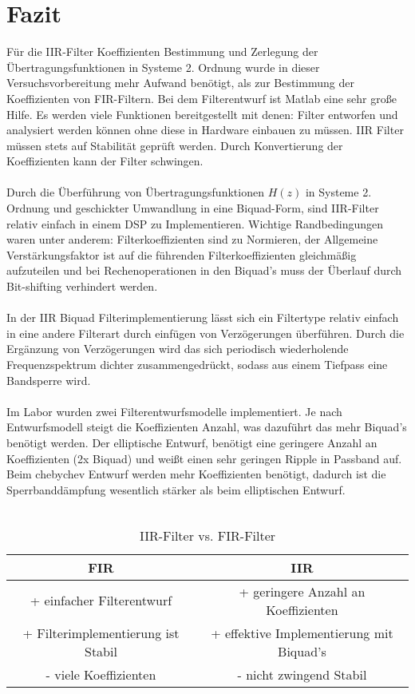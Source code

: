 \section{Fazit}

Für die IIR-Filter Koeffizienten Bestimmung und Zerlegung der Übertragungsfunktionen in Systeme 2. Ordnung wurde in dieser Versuchsvorbereitung mehr Aufwand benötigt, als zur Bestimmung der Koeffizienten von FIR-Filtern. Bei dem Filterentwurf ist Matlab eine sehr große Hilfe. Es werden viele Funktionen bereitgestellt mit denen: Filter entworfen und analysiert werden können ohne diese in Hardware einbauen zu müssen. IIR Filter müssen stets auf Stabilität geprüft werden. Durch Konvertierung der Koeffizienten kann der Filter schwingen.\\\\
\noindent Durch die Überführung von Übertragungsfunktionen $H(z)$ in Systeme 2. Ordnung und geschickter Umwandlung in eine Biquad-Form, sind IIR-Filter relativ einfach in einem DSP zu Implementieren. Wichtige Randbedingungen waren unter anderem: Filterkoeffizienten sind zu Normieren, der Allgemeine Verstärkungsfaktor ist auf die führenden Filterkoeffizienten gleichmäßig aufzuteilen und bei Rechenoperationen in den Biquad's muss der Überlauf durch Bit-shifting verhindert werden.\\\\
In der IIR Biquad Filterimplementierung lässt sich ein Filtertype relativ einfach in eine andere Filterart durch einfügen von Verzögerungen überführen. Durch die Ergänzung von Verzögerungen wird das sich periodisch wiederholende Frequenzspektrum dichter zusammengedrückt, sodass aus einem Tiefpass eine Bandsperre wird.\\\\
Im Labor wurden zwei Filterentwurfsmodelle implementiert. Je nach Entwurfsmodell steigt die Koeffizienten Anzahl, was dazuführt das mehr Biquad's benötigt werden. Der elliptische Entwurf, benötigt eine geringere Anzahl an Koeffizienten (2x Biquad) und weißt einen sehr geringen Ripple in Passband auf. Beim chebychev Entwurf werden mehr Koeffizienten benötigt, dadurch ist die Sperrbanddämpfung wesentlich stärker als beim elliptischen Entwurf.\\\\

\begin{table}[h]
	\centering
	\begin{tabular}{c | c}
	FIR & IIR	\\
	\hline
	+ einfacher Filterentwurf	&	+ geringere Anzahl an Koeffizienten \\
	+ Filterimplementierung ist Stabil		&	+ effektive Implementierung mit Biquad's\\
	- viele Koeffizienten	& - nicht zwingend Stabil\\
	\end{tabular}
	\caption{IIR-Filter vs. FIR-Filter}
\end{table}
